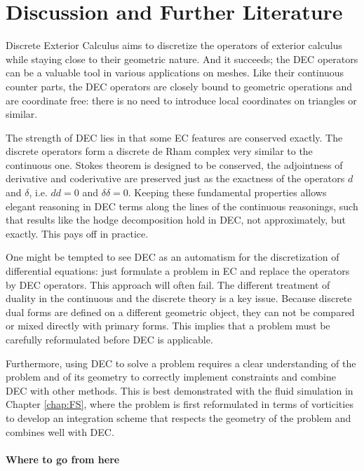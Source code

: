 \chapter{Discussion and Further Literature}
\label{chap:discussion}

Discrete Exterior Calculus aims to discretize the operators of exterior calculus while staying close to their geometric nature. And it succeeds; the DEC operators can be a valuable tool in various applications on meshes. Like their continuous counter parts, the DEC operators are closely bound to geometric operations and are coordinate free: there is no need to introduce local coordinates on triangles or similar. 

The strength of DEC lies in that some EC features are conserved exactly. The discrete operators form a discrete de Rham complex very similar to the continuous one. Stokes theorem is designed to be conserved, the adjointness of derivative and coderivative are preserved just as the exactness of the operators $d$ and $\delta$, i.e. $dd = 0$ and $\delta\delta = 0$. Keeping these fundamental properties allows elegant reasoning in DEC terms along the lines of the continuous reasonings, such that results like the hodge decomposition hold in DEC, not approximately, but exactly. This pays off in practice.

One might be tempted to see DEC as an automatism for the discretization of differential equations: just formulate a problem in EC and replace the operators by DEC operators. This approach will often fail. The different treatment of duality in the continuous and the discrete theory is a key issue. Because discrete dual forms are defined on a different geometric object, they can not be compared or mixed directly with primary forms. This implies that a problem must be carefully reformulated before DEC is applicable.

Furthermore, using DEC to solve a problem requires a clear understanding of the problem and of its geometry to correctly implement constraints and combine DEC with other methods. This is best demonstrated with the fluid simulation in Chapter \ref{chap:FS}, where the problem is first reformulated in terms of vorticities to develop an integration scheme that respects the geometry of the problem and combines well with DEC.

\subsubsection{Where to go from here}

